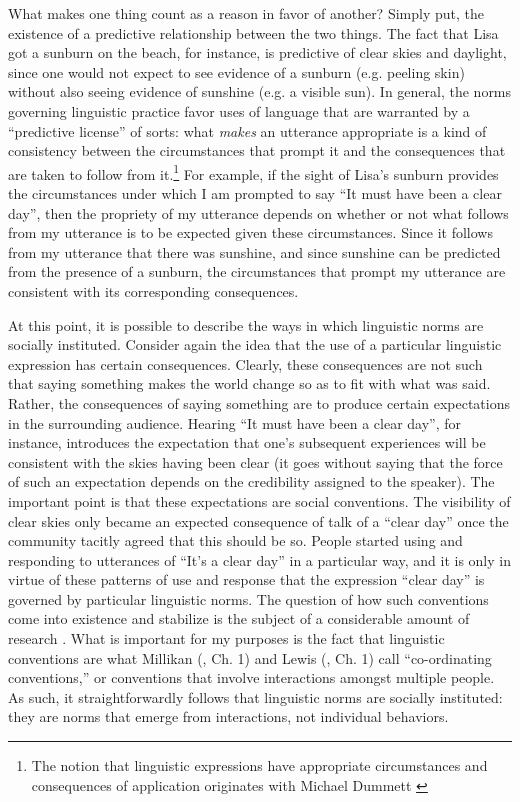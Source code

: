 What makes one thing count as a reason in favor of another? Simply put, the existence of a predictive relationship between the two things. The fact that Lisa got a sunburn on the beach, for instance, is predictive of clear skies and daylight, since one would not expect to see evidence of a sunburn (e.g. peeling skin) without also seeing evidence of sunshine (e.g. a visible sun). In general, the norms governing linguistic practice favor uses of language that are warranted by a ``predictive license'' of sorts: what \textit{makes} an utterance appropriate is a kind of consistency between the circumstances that prompt it and the consequences that are taken to follow from it.\footnote{The notion that linguistic expressions have appropriate circumstances and consequences of application originates with Michael Dummett \citep{Brandom:1994}} For example, if the sight of Lisa's sunburn provides the circumstances under which I am prompted to say ``It must have been a clear day'', then the propriety of my utterance depends on whether or not what follows from my utterance is to be expected given these circumstances. Since it follows from my utterance that there was sunshine, and since sunshine can be predicted from the presence of a sunburn, the circumstances that prompt my utterance are consistent with its corresponding consequences.

At this point, it is possible to describe the ways in which linguistic norms are socially instituted. Consider again the idea that the use of a particular linguistic expression has certain consequences. Clearly, these consequences are not such that saying something makes the world change so as to fit with what was said. Rather, the consequences of saying something are to produce certain expectations in the surrounding audience. Hearing ``It must have been a clear day'', for instance, introduces the expectation that one's subsequent experiences will be consistent with the skies having been clear (it goes without saying that the force of such an expectation depends on the credibility assigned to the speaker). The important point is that these expectations are social conventions. The visibility of clear skies only became an expected consequence of talk of a ``clear day'' once the community tacitly agreed that this should be so. People started using and responding to utterances of ``It's a clear day'' in a particular way, and it is only in virtue of these patterns of use and response that the expression ``clear day'' is governed by particular linguistic norms. The question of how such conventions come into existence and stabilize is the subject of a considerable amount of research \citep{Millikan:2005}. What is important for my purposes is the fact that linguistic conventions are what Millikan (\citeyear{Millikan:2005}, Ch. 1) and Lewis (\citeyear{Lewis:1969}, Ch. 1) call ``co-ordinating conventions,'' or conventions that involve interactions amongst multiple people. As such, it straightforwardly follows that linguistic norms are socially instituted: they are norms that emerge from interactions, not individual behaviors.

